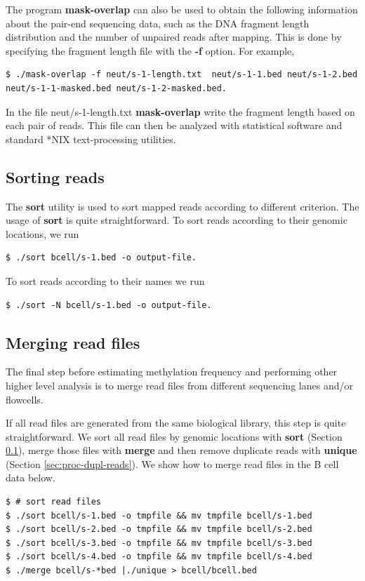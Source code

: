 \documentclass{article}
\begin{document}
The program \textbf{mask-overlap} can also be used to obtain the
following information about the pair-end sequencing data, such as the
DNA fragment length distribution and the number of unpaired reads
after mapping. This is done by specifying the fragment length file
with the \textbf{-f} option. For example,
\begin{verbatim}
$ ./mask-overlap -f neut/s-1-length.txt  neut/s-1-1.bed neut/s-1-2.bed 
neut/s-1-1-masked.bed neut/s-1-2-masked.bed.
\end{verbatim}
In the file neut/s-1-length.txt \textbf{mask-overlap} write the
fragment length based on each pair of reads. This file can then be
analyzed with statistical software and standard *NIX text-processing
utilities. 

\subsection{Sorting reads}
\label{sec:sorting-reads}
The \textbf{sort} utility is used to sort mapped reads according to
different criterion. The usage of \textbf{sort} is quite
straightforward. To sort reads according to their genomic locations,
we run
\begin{verbatim}
$ ./sort bcell/s-1.bed -o output-file.
\end{verbatim}
To sort reads according to their names we run 
\begin{verbatim}
$ ./sort -N bcell/s-1.bed -o output-file.
\end{verbatim}

\subsection{Merging read files}
\label{sec:merging-reads-files}
The final step before estimating methylation frequency and performing
other higher level analysis is to merge read files from different
sequencing lanes and/or flowcells. 

If all read files are generated from the same biological library, this
step is quite straightforward. We sort all read files by genomic
locations with \textbf{sort} (Section \ref{sec:sorting-reads}), merge
those files with \textbf{merge} and then remove duplicate reads with
\textbf{unique} (Section \ref{sec:proc-dupl-reads}). We show how to
merge read files in the B cell data below.
\begin{verbatim}
$ # sort read files
$ ./sort bcell/s-1.bed -o tmpfile && mv tmpfile bcell/s-1.bed
$ ./sort bcell/s-2.bed -o tmpfile && mv tmpfile bcell/s-2.bed
$ ./sort bcell/s-3.bed -o tmpfile && mv tmpfile bcell/s-3.bed
$ ./sort bcell/s-4.bed -o tmpfile && mv tmpfile bcell/s-4.bed
$ ./merge bcell/s-*bed |./unique > bcell/bcell.bed 
\end{verbatim}
\end{document}

